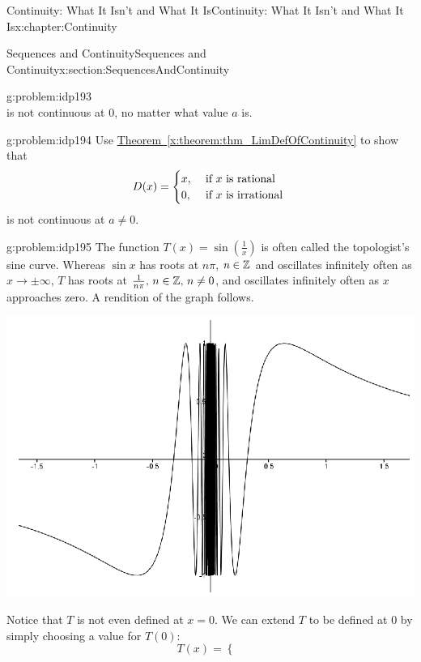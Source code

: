 \begin{chapterptx}{Continuity: What It Isn't and What It Is}{}{Continuity: What It Isn't and What It Is}{}{}{x:chapter:Continuity}
\begin{sectionptx}{Sequences and Continuity}{}{Sequences and Continuity}{}{}{x:section:SequencesAndContinuity}
\begin{problem}{}{g:problem:idp193}
\begin{equation*}
			\end{equation*}
			is not continuous at \(0\), no matter what value \(a\) is.%
		\end{problem}
		\begin{problem}{}{g:problem:idp194}%
			Use \hyperref[x:theorem:thm_LimDefOfContinuity]{Theorem~{\xreffont\ref{x:theorem:thm_LimDefOfContinuity}}} to show that%
			\begin{equation*}
				D(x)= \begin{cases}
					x, & \text{ if } x\text{ is rational } \\
					0, & \text{ if } x\text{ is irrational } \end{cases}  
			\end{equation*}
			is not continuous at \(a\neq 0\).%
		\end{problem}
		\begin{problem}{}{g:problem:idp195}%
			The function \(T(x)=\sin\left(\frac{1}{x}\right)\) is often called the topologist's sine curve.  Whereas \(\sin
			x\) has roots at \(n\pi\), \(n\in\mathbb {Z}\) and oscillates infinitely often as \(x\rightarrow\pm\infty\), \(T\) has roots at \(\frac{1}{n\pi},\,n\in\mathbb {Z},\,n\neq
			0\), and oscillates infinitely often as \(x\) approaches zero.  A rendition of the graph follows.%
			\begin{image}{0.125}{0.75}{0.125}%
				\includegraphics[width=\linewidth]{external/images/Ch5fig7.png}
			\end{image}%
			Notice that \(T\) is not even defined at \(x=0\). We can extend \(T\) to be defined at 0 by simply choosing a value for \(T(0):\)%
			\begin{equation*}
				T(x)= \begin{cases}

\end{cases}
\end{equation*}
\end{problem}
\end{sectionptx}
\end{chapterptx}
